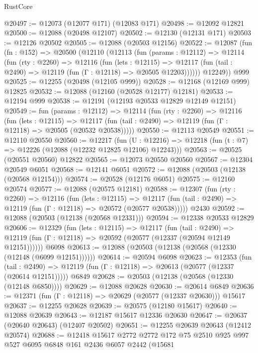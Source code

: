 \begin{lexlean}{RustCore}
\begin{coremodule}
@20497 := @12073 (@12077 @171) (@12083 @171)
@20498 := @12092 @12821
@20500 := @12088 (@20498 @12107)
@20502 := @12130 (@12131 @171)
@20503 := @12126 @20502
@20505 := @12088 (@20503 @12156)
@20522 := @12087
    (fun (fn : @152) =>
    @20500
      (@12110
        (@12113
          (fun (params : @12112) =>
          @12114
            (fun (rty : @2260) =>
            @12116
              (fun (lets : @12115) =>
              @12117 (fun (tail : @2490) => @12119 (fun (Γ : @12118) => @20505 @12203))))))
        @12249))
    @999
@20525 := @12255 (@20498 (@12105 @999))
@20528 := @12168 (@12169 @999) @12825
@20532 := @12088 (@12160 (@20528 @12177) @12181)
@20533 := @12194 @999
@20538 := @12191 (@12193 @20533 @12829 @12149 @12151)
@20549 := fun (params : @12112) =>
  @12114
    (fun (rty : @2260) =>
    @12116
      (fun (lets : @12115) =>
      @12117 (fun (tail : @2490) => @12119 (fun (Γ : @12118) => @20505 (@20532 @20538)))))
@20550 := @12113 @20549
@20551 := @12110 @20550
@20560 := @12217
    (fun (U : @12216) => @12218 (fun (t : @7) => @12226 (@12088 (@12232 @12825 @12106) @12243)))
@20563 := @20525 (@20551 @20560) @12822
@20565 := @12073 @20550 @20560
@20567 := @12304 @20549 @6051
@20568 := @12141 @6051
@20572 := @12088 (@20503 (@12138 (@20568 @12154)))
@20574 := @20528 (@12176 @6051)
@20575 := @12160 @20574
@20577 := @12088 (@20575 @12181)
@20588 := @12307
    (fun (rty : @2260) =>
    @12116
      (fun (lets : @12115) =>
      @12117 (fun (tail : @2490) => @12119 (fun (Γ : @12118) => @20572 (@20577 @20538)))))
    @2430
@20592 := @12088 (@20503 (@12138 (@20568 @12331)))
@20594 := @12338 @20533 @12829
@20606 := @12329
    (fun (lets : @12115) =>
    @12117
      (fun (tail : @2490) =>
      @12119 (fun (Γ : @12118) => @20592 (@20577 (@12337 (@20594 @12149 @12151))))))
    @6098
@20613 := @12088 (@20503 (@12138 (@20568 (@12330 (@12148 (@6099 @12151))))))
@20614 := @20594 @6098
@20623 := @12353
    (fun (tail : @2490) => @12119 (fun (Γ : @12118) => @20613 (@20577 (@12337 (@20614 @12151)))))
    @6849
@20628 := @20503 (@12138 (@20568 (@12330 (@12148 @6850))))
@20629 := @12088 @20628
@20630 := @20614 @6849
@20636 := @12371 (fun (Γ : @12118) => @20629 (@20577 (@12337 @20630))) @15617
@20637 := @12255 @20628
@20639 := @20575 (@12180 @15617)
@20640 := @12088 @20639
@20643 := @12187 @15617 @12336 @20630
@20647 := @20637 (@20640 @20643) (@12407 @20502)
@20651 := @12255 @20639 @20643 (@12412 @20574)
@20688 := @12418
    @15617
    @2772
    @2772
    @172
    @75
    @2510
    @925
    @997
    @527
    @6095
    @6848
    @161
    @2436
    @6057
    @2442
    (@15681

\end{coremodule}
\end{lexlean}
